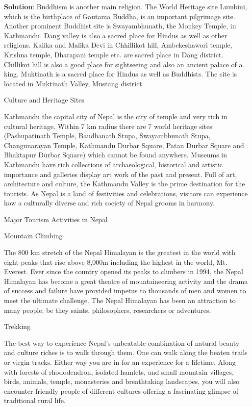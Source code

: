 \documentclass[
  openany]{book}
\newenvironment{solution}{ {\bfseries Solution}:}{}
\begin{document}
\begin{questions}
\begin{solution}
Buddhism is another main religion. The World Heritage site Lumbini, which is the birthplace of Gautama Buddha, is an important pilgrimage site. Another prominent Buddhist site is Swayambhunath, the Monkey Temple, in Kathmandu. Dang valley is also a sacred place for Hindus as well as other religions. Kalika and Malika Devi in Chhillikot hill, Ambekeshawori temple, Krishna temple, Dharapani temple etc. are sacred place in Dang district. Chillikot hill is also a good place for sightseeing and also an ancient palace of a king. Muktinath is a sacred place for Hindus as well as Buddhists. The site is located in Muktinath Valley, Mustang district.

Culture and Heritage Sites

Kathmandu the capital city of Nepal is the city of temple and very rich in cultural heritage. Within 7 km radius there are 7 world heritage sites (Pashupatinath Temple, Baudhanath Stupa, Swayambhunath Stupa, Changunarayan Temple, Kathmandu Durbar Square, Patan Durbar Square and Bhaktapur Durbar Square) which cannot be found anywhere. Museums in Kathmandu have rich collections of archaeological, historical and artistic importance and galleries display art work of the past and present. Full of art, architecture and culture, the Kathmandu Valley is the prime destination for the tourists. As Nepal is a land of festivities and celebrations, visitors can experience how a culturally diverse and rich society of Nepal grooms in harmony.

Major Tourism Activities in Nepal

Mountain Climbing

The 800 km stretch of the Nepal Himalayan is the greatest in the world with eight peaks that rise above 8,000m including the highest in the world, Mt. Everest. Ever since the country opened its peaks to climbers in 1994, the Nepal Himalayan has become a great theatre of mountaineering activity and the drama of success and failure have provided impetus to thousands of men and women to meet the ultimate challenge. The Nepal Himalayan has been an attraction to many people, be they saints, philosophers, researchers or adventures.

Trekking

The best way to experience Nepal’s unbeatable combination of natural beauty and culture riches is to walk through them. One can walk along the beaten trails or virgin tracks. Either way you are in for an experience for a lifetime. Along with forests of rhododendron, isolated hamlets, and small mountain villages, birds, animals, temple, monasteries and breathtaking landscapes, you will also encounter friendly people of different cultures offering a fascinating glimpse of traditional rural life.


\end{solution}
\end{questions}
\end{document}
